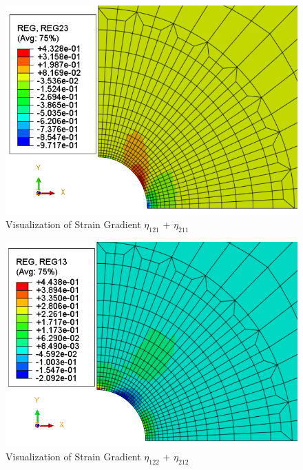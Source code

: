 \documentclass[12pt]{article}
\begin{document}
\begin{figure}[H]
	\begin{center}
		\includegraphics[scale=0.8]{Reg23_crop.png} 
	\end{center}  
   \caption{Visualization of Strain Gradient $\eta_{121}$ + $\eta_{211}$}
\end{figure}
\begin{figure}[H]
	\begin{center}
		\includegraphics[scale=0.8]{Reg13_crop.png} 
	\end{center}  
   \caption{Visualization of Strain Gradient $\eta_{122}$ + $\eta_{212}$}
\end{figure}
\end{document}
